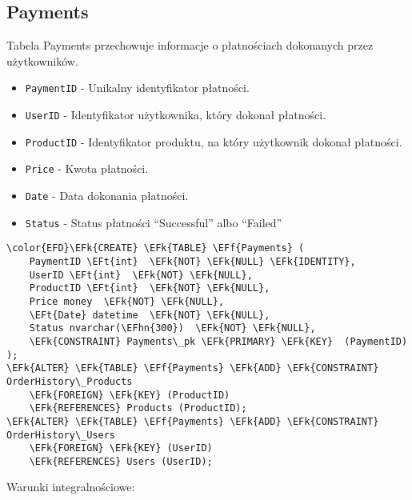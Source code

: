 \documentclass[11pt]{article}
\newcommand{\EFk}[1]{\textcolor{EFk}{\textbf{#1}}} %
\newcommand{\EFf}[1]{\textcolor{EFf}{#1}} %
\newcommand{\EFt}[1]{\textcolor{EFt}{\textbf{#1}}} %
\newcommand{\EFhn}[1]{\textcolor{EFhn}{#1}} %
\begin{document}
\subsection{Payments}
\label{sec:org1107a90}
Tabela Payments przechowuje informacje o płatnościach dokonanych przez użytkowników.
\begin{itemize}
\item \texttt{PaymentID} - Unikalny identyfikator płatności.
\item \texttt{UserID} - Identyfikator użytkownika, który dokonał płatności.
\item \texttt{ProductID} - Identyfikator produktu, na który użytkownik dokonał płatności.
\item \texttt{Price} - Kwota płatności.
\item \texttt{Date} - Data dokonania płatności.
\item \texttt{Status} - Status płatności ``Successful'' albo ``Failed''
\end{itemize}
\begin{Code}
\begin{Verbatim}
\color{EFD}\EFk{CREATE} \EFk{TABLE} \EFf{Payments} (
    PaymentID \EFt{int}  \EFk{NOT} \EFk{NULL} \EFk{IDENTITY},
    UserID \EFt{int}  \EFk{NOT} \EFk{NULL},
    ProductID \EFt{int}  \EFk{NOT} \EFk{NULL},
    Price money  \EFk{NOT} \EFk{NULL},
    \EFt{Date} datetime  \EFk{NOT} \EFk{NULL},
    Status nvarchar(\EFhn{300})  \EFk{NOT} \EFk{NULL},
    \EFk{CONSTRAINT} Payments\_pk \EFk{PRIMARY} \EFk{KEY}  (PaymentID)
);
\EFk{ALTER} \EFk{TABLE} \EFf{Payments} \EFk{ADD} \EFk{CONSTRAINT} OrderHistory\_Products
    \EFk{FOREIGN} \EFk{KEY} (ProductID)
    \EFk{REFERENCES} Products (ProductID);
\EFk{ALTER} \EFk{TABLE} \EFf{Payments} \EFk{ADD} \EFk{CONSTRAINT} OrderHistory\_Users
    \EFk{FOREIGN} \EFk{KEY} (UserID)
    \EFk{REFERENCES} Users (UserID);
\end{Verbatim}
\end{Code}
Warunki integralnościowe:
\end{document}

